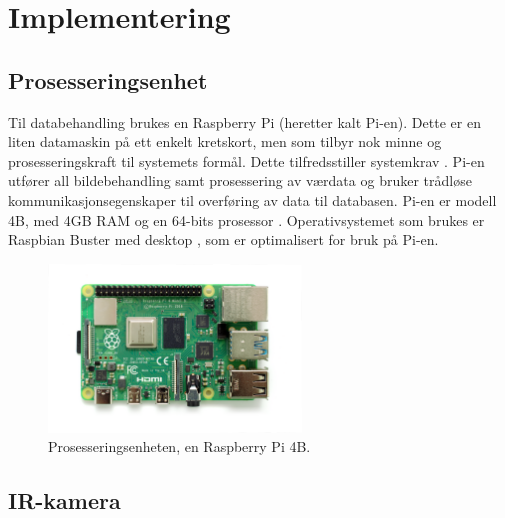 \section{Implementering}
\label{sec:implementering}





\subsection{Prosesseringsenhet}\label{sec:impl:prosessor}

Til databehandling brukes en Raspberry Pi (heretter kalt Pi-en). 
Dette er en liten datamaskin på ett enkelt kretskort, men som tilbyr nok minne og prosesseringskraft til systemets formål. 
Dette tilfredsstiller systemkrav . 
Pi-en utfører all bildebehandling samt prosessering av værdata og bruker trådløse kommunikasjonsegenskaper til overføring av data til databasen. 
Pi-en er modell 4B, med 4GB RAM og en 64-bits prosessor \cite{raspberry}. 
Operativsystemet som brukes er Raspbian Buster med desktop \cite{raspbian}, som er optimalisert for bruk på Pi-en.

\begin{figure}[H]
    \centering
    \includegraphics[width=0.6\textwidth]{implementering/pi4.png}
    \caption{Prosesseringsenheten, en Raspberry Pi 4B.}
    \label{fig:pi}
\end{figure}


\subsection{IR-kamera}\label{sec:impl:kamera}

